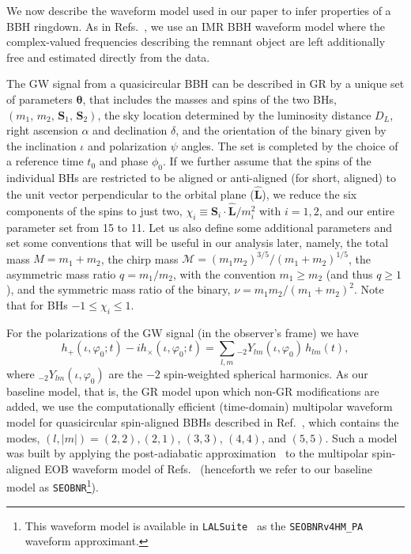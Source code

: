 \documentclass[twocolumn,
               prd,
               aps,
               superscriptaddress,
               tightenlines,
               nofootinbib,
               eqsecnum,
               amsfonts,
               amsmath,
               longbibliography]{revtex4-1}
\newcommand{\SEOB}{\texttt{SEOBNR}}
\newcommand{\abcomm}[1]{{\textcolor{red}{{[AB: #1]}}}}
\begin{document}
We now describe the waveform model used in our paper to infer properties of a
BBH ringdown.
%
As in Refs.~\cite{Brito:2018rfr,Ghosh:2021mrv}, we use an IMR BBH waveform
model where the complex-valued frequencies describing the remnant object
are left additionally free and estimated directly from the data.

The GW signal from a quasicircular BBH can be described  in GR by a unique set of
parameters $\bm{\theta}$, that includes the masses and spins of the two BHs,
$(m_1,\, m_2,\, \mathbf{S}_1,\, \mathbf{S}_2)$, the sky location determined by the
luminosity distance $D_L$,
right ascension $\alpha$ and declination $\delta$,
and the orientation of the binary given by the inclination $\iota$ and polarization $\psi$
angles.
%
The set is completed by the choice of a reference time $t_0$ and phase
$\phi_0$. If we further assume that the spins of the individual BHs are
restricted to be aligned or anti-aligned (for short, aligned) to the unit vector
perpendicular to the orbital plane ($\mathbf{\hat{L}}$), we reduce the six
components of the spins to just two, $\chi_i \equiv \mathbf{S}_i\cdot \mathbf{\hat{L}} /m_i^2$ with $i = 1,2$,
and our entire parameter set from 15 to 11.
%
Let us also define some additional parameters and set some conventions that
will be useful in our analysis later, namely, the total mass
%
$M=m_1+m_2$,
%
the chirp mass
%
$\mathcal {M}=(m_{1}m_{2})^{3/5}/(m_{1}+m_{2})^{1/5}$,
%
the asymmetric mass ratio $q=m_1/m_2$, with the convention $m_1 \geqslant m_2$ (and thus $q \geqslant 1$),
and the symmetric mass ratio of the binary, $\nu = m_1m_2/(m_1+m_2)^2$. Note that for BHs $-1 \leqslant \chi_i \leqslant 1$.

For the polarizations of the GW signal (in the observer's frame) we have
%
\begin{equation}
h_+(\iota,\varphi_0;t ) - i h_\times(\iota,\varphi_0;t) = \sum_{l, m} {}_{-\!2}Y_{l m}(\iota,\varphi_0)\, h_{l m}(t),
\end{equation}
%
where ${}_{-\!2}Y_{l m}(\iota,\varphi_0)$ are the $-2$ spin-weighted spherical
harmonics.
%
%
As our baseline model, that is, the GR model upon which non-GR modifications
are added, we use the computationally efficient (time-domain) multipolar
waveform model for quasicircular spin-aligned BBHs described in
Ref.~\cite{Mihaylov:2021bpf}, which contains the modes, $(l, |m|)=(2,2),(2,1)$, $(3,3)$, $(4,4)$,
and $(5,5)$. Such a model was built by applying the post-adiabatic approximation~\cite{Nagar:2018gnk}
to the multipolar spin-aligned EOB waveform model of Refs.~\cite{Bohe:2016gbl,Cotesta:2018fcv} (henceforth we refer to our baseline model as \SEOB{}\footnote{This waveform
model is available in \texttt{LALSuite}~\cite{lalsuite} as the \texttt{SEOBNRv4HM\_PA}
waveform approximant.}).
\end{document}
